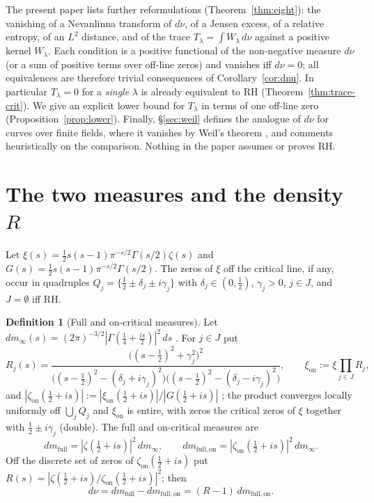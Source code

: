 \documentclass[11pt]{amsart}
\theoremstyle{definition}
\newtheorem{definition}[theorem]{Definition}
\theoremstyle{remark}
\newcommand{\RH}{\mathrm{RH}}
\newcommand{\half}{\tfrac12}
\newcommand{\dnu}{d\nu}
\newcommand{\dmfull}{dm_{\mathrm{full}}}
\newcommand{\dmon}{dm_{\mathrm{full,on}}}
\newcommand{\zon}{\zeta_{\mathrm{on}}}
\newcommand{\xon}{\xi_{\mathrm{on}}}
\newcommand{\Tlam}{T_\lambda}
\newcommand{\Wlam}{W_\lambda}
\begin{document}
The present paper lists further reformulations (Theorem~\ref{thm:eight}): the vanishing of a
Nevanlinna transform of $\dnu$, of a Jensen excess, of a relative entropy, of an $L^2$ distance,
and of the trace $\Tlam=\int\Wlam\,\dnu$ against a positive kernel $\Wlam$. Each condition is a
positive functional of the non-negative measure $\dnu$ (or a sum of positive terms over off-line
zeros) and vanishes iff $\dnu=0$; all equivalences are therefore trivial consequences of
Corollary~\ref{cor:dnu}. In particular $\Tlam=0$ for a \emph{single} $\lambda$ is already
equivalent to $\RH$ (Theorem~\ref{thm:trace-crit}). We give an explicit lower bound for $\Tlam$
in terms of one off-line zero (Proposition~\ref{prop:lower}). Finally, \S\ref{sec:weil} defines
the analogue of $\dnu$ for curves over finite fields, where it vanishes by Weil's theorem
\cite{Weil48}, and comments heuristically on the comparison. Nothing in the paper assumes or
proves $\RH$.

\section{The two measures and the density \texorpdfstring{$R$}{R}}\label{sec:measures}

Let $\xi(s)=\half s(s-1)\pi^{-s/2}\Gamma(s/2)\zeta(s)$ and $G(s)=\half s(s-1)\pi^{-s/2}\Gamma(s/2)$.
The zeros of $\xi$ off the critical line, if any, occur in quadruples
$Q_j=\{\half\pm\delta_j\pm i\gamma_j\}$ with $\delta_j\in(0,\half)$, $\gamma_j>0$, $j\in J$, and
$J=\emptyset$ iff $\RH$.

\begin{definition}[Full and on-critical measures]\label{def:measures}
Let $dm_\infty(s)=(2\pi)^{-3/2}|\Gamma(\tfrac14+\tfrac{is}2)|^2\,ds$
\cite[Def.~2.1]{MomentRigidity}. For $j\in J$ put
\[
R_j(s)=\frac{\bigl((s-\half)^2+\gamma_j^2\bigr)^2}
{\bigl((s-\half)^2-(\delta_j+i\gamma_j)^2\bigr)\bigl((s-\half)^2-(\delta_j-i\gamma_j)^2\bigr)},
\qquad \xon:=\xi\prod_{j\in J}R_j,
\]
and $|\zon(\half+is)|:=|\xon(\half+is)|/|G(\half+is)|$ \cite[Def.~3.1,
Lemma~3.2]{MomentRigidity}; the product converges locally uniformly off $\bigcup_jQ_j$ and $\xon$
is entire, with zeros the critical zeros of $\xi$ together with $\half\pm i\gamma_j$ (double).
The full and on-critical measures are
\[
\dmfull=|\zeta(\half+is)|^2\,dm_\infty,\qquad
\dmon=|\zon(\half+is)|^2\,dm_\infty .
\]
Off the discrete set of zeros of $\zon(\half+is)$ put $R(s)=|\zeta(\half+is)/\zon(\half+is)|^2$;
then
\[
\dnu=\dmfull-\dmon=(R-1)\,\dmon .
\]
\end{definition}
\end{document}
